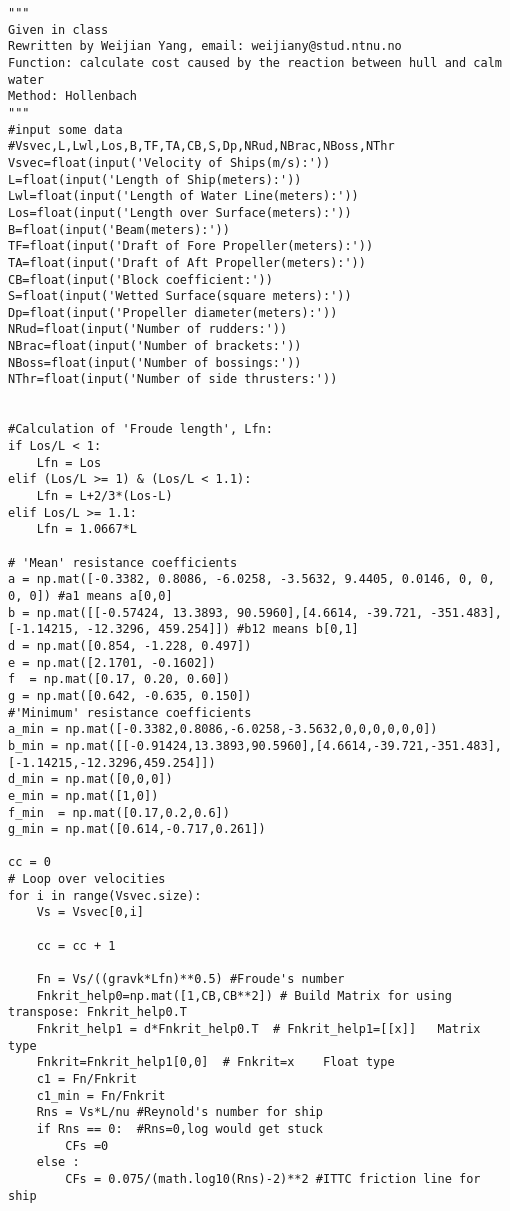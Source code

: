 \begin{lstlisting}[caption=Rewritten Python script based on the given MATLAB script (\autoref{Cost Hull}), label=oricalcosthull]
""" 
Given in class
Rewritten by Weijian Yang, email: weijiany@stud.ntnu.no
Function: calculate cost caused by the reaction between hull and calm water
Method: Hollenbach
"""
#input some data
#Vsvec,L,Lwl,Los,B,TF,TA,CB,S,Dp,NRud,NBrac,NBoss,NThr
Vsvec=float(input('Velocity of Ships(m/s):'))
L=float(input('Length of Ship(meters):'))
Lwl=float(input('Length of Water Line(meters):'))
Los=float(input('Length over Surface(meters):'))
B=float(input('Beam(meters):'))
TF=float(input('Draft of Fore Propeller(meters):'))
TA=float(input('Draft of Aft Propeller(meters):'))
CB=float(input('Block coefficient:'))
S=float(input('Wetted Surface(square meters):'))
Dp=float(input('Propeller diameter(meters):'))
NRud=float(input('Number of rudders:')) 
NBrac=float(input('Number of brackets:'))
NBoss=float(input('Number of bossings:'))
NThr=float(input('Number of side thrusters:'))


#Calculation of 'Froude length', Lfn:
if Los/L < 1:
    Lfn = Los
elif (Los/L >= 1) & (Los/L < 1.1):
    Lfn = L+2/3*(Los-L)
elif Los/L >= 1.1:
    Lfn = 1.0667*L

# 'Mean' resistance coefficients
a = np.mat([-0.3382, 0.8086, -6.0258, -3.5632, 9.4405, 0.0146, 0, 0, 0, 0]) #a1 means a[0,0]
b = np.mat([[-0.57424, 13.3893, 90.5960],[4.6614, -39.721, -351.483],[-1.14215, -12.3296, 459.254]]) #b12 means b[0,1]
d = np.mat([0.854, -1.228, 0.497])
e = np.mat([2.1701, -0.1602])
f  = np.mat([0.17, 0.20, 0.60])
g = np.mat([0.642, -0.635, 0.150])
#'Minimum' resistance coefficients
a_min = np.mat([-0.3382,0.8086,-6.0258,-3.5632,0,0,0,0,0,0])
b_min = np.mat([[-0.91424,13.3893,90.5960],[4.6614,-39.721,-351.483],[-1.14215,-12.3296,459.254]])
d_min = np.mat([0,0,0])
e_min = np.mat([1,0])
f_min  = np.mat([0.17,0.2,0.6])
g_min = np.mat([0.614,-0.717,0.261])

cc = 0
# Loop over velocities
for i in range(Vsvec.size):
    Vs = Vsvec[0,i]

    cc = cc + 1

    Fn = Vs/((gravk*Lfn)**0.5) #Froude's number
    Fnkrit_help0=np.mat([1,CB,CB**2]) # Build Matrix for using transpose: Fnkrit_help0.T
    Fnkrit_help1 = d*Fnkrit_help0.T  # Fnkrit_help1=[[x]]   Matrix type
    Fnkrit=Fnkrit_help1[0,0]  # Fnkrit=x    Float type
    c1 = Fn/Fnkrit
    c1_min = Fn/Fnkrit
    Rns = Vs*L/nu #Reynold's number for ship
    if Rns == 0:  #Rns=0,log would get stuck
        CFs =0
    else :
        CFs = 0.075/(math.log10(Rns)-2)**2 #ITTC friction line for ship


\end{lstlisting}
